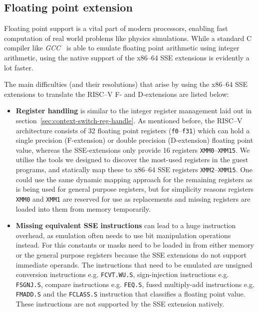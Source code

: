 \subsection{Floating point extension}
\label{subsec:fp_extension}
Floating point support is a vital part of modern processors, enabling fast computation of real world problems like physics simulations.
While a standard C compiler like \textit{GCC}~\cite{gcc-web} is able to emulate floating point arithmetic using integer arithmetic, using the native support of the x86--64 SSE extensions is evidently a lot faster.

The main difficulties (and their resolutions) that arise by using the x86--64 SSE extensions to translate the RISC--V F- and D-extensions are listed below:
\begin{itemize}
    \item \textbf{Register handling} is similar to the integer register management laid out in section~\ref{sec:context-switch-reg-handle}.
            As mentioned before, the RISC--V architecture consists of 32 floating point registers (\texttt{f0}--\texttt{f31}) which can hold a single precision (F-extension) or double precision (D-extension) floating point value, whereas the SSE-extensions only provide 16 registers \texttt{XMM0}--\texttt{XMM15}.
            We utilise the tools we designed to discover the most-used registers in the guest programs, and statically map these to x86--64 SSE registers \texttt{XMM2}--\texttt{XMM15}.
            One could use the same dynamic mapping approach for the remaining registers as is being used for general purpose registers, but for simplicity reasons registers \texttt{XMM0} and \texttt{XMM1} are reserved for use as replacements and missing registers are loaded into them from memory temporarily.
    \item \textbf{Missing equivalent SSE instructions} can lead to a huge instruction overhead, as emulation often needs to use bit manipulation operations instead.
            For this constants or masks need to be loaded in from either memory or the general purpose registers because the SSE extensions do not support immediate operands.
            The instructions that need to be emulated are unsigned conversion instructions e.g. \texttt{FCVT.WU.S}, sign-injection instructions e.g. \texttt{FSGNJ.S}, compare instructions e.g. \texttt{FEQ.S}, fused multiply-add instructions e.g. \texttt{FMADD.S} and the \texttt{FCLASS.S} instruction that classifies a floating point value.
            These instructions are not supported by the SSE extension natively.

\end{itemize}

